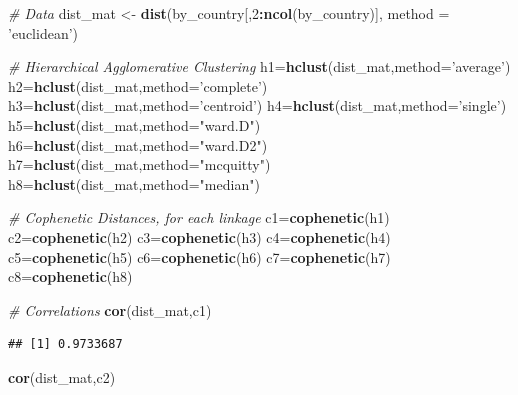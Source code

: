 \documentclass[]{article}
\newenvironment{Shaded}{\begin{snugshade}}{\end{snugshade}}
\newcommand{\CommentTok}[1]{\textcolor[rgb]{0.56,0.35,0.01}{\textit{#1}}}
\newcommand{\DataTypeTok}[1]{\textcolor[rgb]{0.13,0.29,0.53}{#1}}
\newcommand{\DecValTok}[1]{\textcolor[rgb]{0.00,0.00,0.81}{#1}}
\newcommand{\KeywordTok}[1]{\textcolor[rgb]{0.13,0.29,0.53}{\textbf{#1}}}
\newcommand{\NormalTok}[1]{#1}
\newcommand{\OperatorTok}[1]{\textcolor[rgb]{0.81,0.36,0.00}{\textbf{#1}}}
\newcommand{\StringTok}[1]{\textcolor[rgb]{0.31,0.60,0.02}{#1}}
\begin{document}
\begin{Shaded}
\begin{Highlighting}[]
\CommentTok{# Data}
\NormalTok{dist_mat <-}\StringTok{ }\KeywordTok{dist}\NormalTok{(by_country[,}\DecValTok{2}\OperatorTok{:}\KeywordTok{ncol}\NormalTok{(by_country)], }\DataTypeTok{method =} \StringTok{'euclidean'}\NormalTok{)}

\CommentTok{# Hierarchical Agglomerative Clustering}
\NormalTok{h1=}\KeywordTok{hclust}\NormalTok{(dist_mat,}\DataTypeTok{method=}\StringTok{'average'}\NormalTok{)}
\NormalTok{h2=}\KeywordTok{hclust}\NormalTok{(dist_mat,}\DataTypeTok{method=}\StringTok{'complete'}\NormalTok{)}
\NormalTok{h3=}\KeywordTok{hclust}\NormalTok{(dist_mat,}\DataTypeTok{method=}\StringTok{'centroid'}\NormalTok{)}
\NormalTok{h4=}\KeywordTok{hclust}\NormalTok{(dist_mat,}\DataTypeTok{method=}\StringTok{'single'}\NormalTok{)}
\NormalTok{h5=}\KeywordTok{hclust}\NormalTok{(dist_mat,}\DataTypeTok{method=}\StringTok{"ward.D"}\NormalTok{)}
\NormalTok{h6=}\KeywordTok{hclust}\NormalTok{(dist_mat,}\DataTypeTok{method=}\StringTok{"ward.D2"}\NormalTok{)}
\NormalTok{h7=}\KeywordTok{hclust}\NormalTok{(dist_mat,}\DataTypeTok{method=}\StringTok{"mcquitty"}\NormalTok{)}
\NormalTok{h8=}\KeywordTok{hclust}\NormalTok{(dist_mat,}\DataTypeTok{method=}\StringTok{"median"}\NormalTok{)}

\CommentTok{# Cophenetic Distances, for each linkage}
\NormalTok{c1=}\KeywordTok{cophenetic}\NormalTok{(h1)}
\NormalTok{c2=}\KeywordTok{cophenetic}\NormalTok{(h2)}
\NormalTok{c3=}\KeywordTok{cophenetic}\NormalTok{(h3)}
\NormalTok{c4=}\KeywordTok{cophenetic}\NormalTok{(h4)}
\NormalTok{c5=}\KeywordTok{cophenetic}\NormalTok{(h5)}
\NormalTok{c6=}\KeywordTok{cophenetic}\NormalTok{(h6)}
\NormalTok{c7=}\KeywordTok{cophenetic}\NormalTok{(h7)}
\NormalTok{c8=}\KeywordTok{cophenetic}\NormalTok{(h8)}

\CommentTok{# Correlations}
\KeywordTok{cor}\NormalTok{(dist_mat,c1) }
\end{Highlighting}
\end{Shaded}

\begin{verbatim}
## [1] 0.9733687
\end{verbatim}

\begin{Shaded}
\begin{Highlighting}[]
\KeywordTok{cor}\NormalTok{(dist_mat,c2) }
\end{Highlighting}
\end{Shaded}
\end{document}
